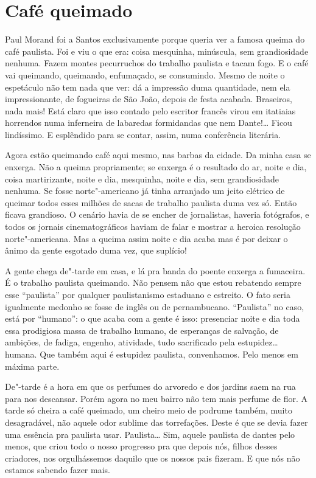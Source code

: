 \chapter{Café queimado}

Paul Morand foi a Santos exclusivamente porque queria ver a famosa
queima do café paulista. Foi e viu o que era: coisa mesquinha,
minúscula, sem grandiosidade nenhuma. Fazem montes pecurruchos do
trabalho paulista e tacam fogo. E o café vai queimando, queimando,
enfumaçado, se consumindo. Mesmo de noite o espetáculo não tem nada que
ver: dá a impressão duma quantidade, nem ela impressionante, de
fogueiras de São João, depois de festa acabada. Braseiros, nada mais!
Está claro que isso contado pelo escritor francês virou em itatiaias
horrendos numa inferneira de labaredas formidandas que nem Dante!\ldots{}
Ficou lindíssimo. E esplêndido para se contar, assim, numa conferência
literária.

Agora estão queimando café aqui mesmo, nas barbas da cidade. Da minha
casa se enxerga. Não a queima propriamente; se enxerga é o resultado do
ar, noite e dia, coisa martirizante, noite e dia, mesquinha, noite e
dia, sem grandiosidade nenhuma. Se fosse norte"-americano já tinha
arranjado um jeito elétrico de queimar todos esses milhões de sacas de
trabalho paulista duma vez só. Então ficava grandioso. O cenário havia
de se encher de jornalistas, haveria fotógrafos, e todos os jornais
cinematográficos haviam de falar e mostrar a heroica resolução
norte"-americana. Mas a queima assim noite e dia acaba mas é por deixar o
ânimo da gente esgotado duma vez, que suplício!

A gente chega de"-tarde em casa, e lá pra banda do poente enxerga a
fumaceira. É o trabalho paulista queimando. Não pensem não que estou
rebatendo sempre esse ``paulista'' por qualquer paulistanismo estaduano
e estreito. O fato seria igualmente medonho se fosse de inglês ou de
pernambucano. ``Paulista'' no caso, está por ``humano'': o que acaba com
a gente é isso: presenciar noite e dia toda essa prodigiosa massa de
trabalho humano, de esperanças de salvação, de ambições, de fadiga,
engenho, atividade, tudo sacrificado pela estupidez\ldots{} humana. Que
também aqui é estupidez paulista, convenhamos. Pelo menos em máxima
parte.

De"-tarde é a hora em que os perfumes do arvoredo e dos jardins saem na
rua para nos descansar. Porém agora no meu bairro não tem mais perfume
de flor. A tarde só cheira a café queimado, um cheiro meio de podrume
também, muito desagradável, não aquele odor sublime das torrefações.
Deste é que se devia fazer uma essência pra paulista usar. Paulista\ldots{}
Sim, aquele paulista de dantes pelo menos, que criou todo o nosso
progresso pra que depois nós, filhos desses criadores, nos orgulhássemos
daquilo que os nossos pais fizeram. E que nós não estamos sabendo fazer
mais.

